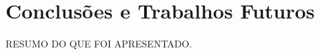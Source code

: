 \chapter{Conclusões e Trabalhos Futuros}
\label{chap:conclusoes-e-trabalhos-futuros}

RESUMO DO QUE FOI APRESENTADO.







